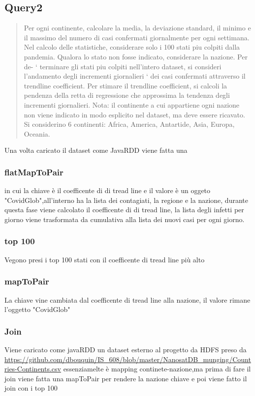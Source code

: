 \documentclass[acmsmall]{acmart}
\begin{document}
\subsection{Query2}
\begin{quote}
Per ogni continente, calcolare la media, la deviazione standard, il minimo e il massimo del numero di
casi confermati giornalmente per ogni settimana. Nel calcolo delle statistiche, considerare solo i 100
stati piu colpiti dalla pandemia. Qualora lo stato non fosse indicato, considerare la nazione. Per de- `
terminare gli stati piu colpiti nell’intero dataset, si consideri l’andamento degli incrementi giornalieri `
dei casi confermati attraverso il trendline coefficient. Per stimare il trendline coefficient, si calcoli la
pendenza della retta di regressione che approssima la tendenza degli incrementi giornalieri.
Nota: il continente a cui appartiene ogni nazione non viene indicato in modo esplicito nel dataset, ma
deve essere ricavato. Si considerino 6 continenti: Africa, America, Antartide, Asia, Europa, Oceania.\end{quote}

Una volta caricato il dataset come JavaRDD viene fatta una 
\subsubsection{flatMapToPair}
in cui la chiave è il coefficente di di tread line e il valore è un oggeto
"CovidGlob",all'interno ha la lista dei contagiati, la regione e la nazione, durante questa fase viene calcolato il coefficente di di tread line, la lista degli infetti per giorno viene trasformata da cumulativa alla lista dei nuovi casi per ogni giorno.
\subsubsection{top 100}
Vegono presi i top 100 stati con il coefficente di tread line più alto

\subsubsection{mapToPair}
La chiave vine cambiata dal coefficente di tread line alla nazione, il valore rimane l'oggetto  "CovidGlob"

\subsubsection{Join}
Viene caricato come javaRDD un dataset esterno al progetto da HDFS preso da \\ \url{https://github.com/dbouquin/IS_608/blob/master/NanosatDB_munging/Countries-Continents.csv}   
essenziamelte è mapping continete-nazione,ma prima di fare il join viene fatta una mapToPair per rendere la nazione chiave e poi viene fatto il join con i top 100
\end{document}
